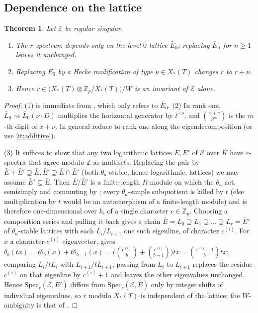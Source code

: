 \documentclass[11pt,reqno]{amsart}
\newcommand{\Zp}{\mathbb{Z}_p}
\newcommand{\ZZ}{\mathbb{Z}}
\newcommand{\cE}{\mathcal{E}}
\newcommand{\Xst}{X_*(T)}
\theoremstyle{plain}
\newtheorem{theorem}{Theorem}[section]
\theoremstyle{definition}
\theoremstyle{remark}
\numberwithin{equation}{section}
\begin{document}
\subsection{Dependence on the lattice}
\begin{theorem}\label{thm:welldef}
Let $\cE$ be regular singular.
\begin{enumerate}
\item The $r$-spectrum depends only on the level-$0$ lattice $\bar E_0$;
      replacing $\bar E_n$ for $n\ge1$ leaves it unchanged.
\item Replacing $\bar E_0$ by a Hecke modification of type $\nu\in\Xst$
      changes $r$ to $r+\nu$.
\item Hence
      $\bar r\in\bigl(\Xst\otimes\Zp/\Xst\bigr)/W$
      is an invariant of $\cE$ alone.
\end{enumerate}
\end{theorem}
\begin{proof}
(1) is immediate from , which only refers to $\bar E_0$.
(2) In rank one, $\bar L_0\rightsquigarrow\bar L_0(\nu\cdot D)$ multiplies
the horizontal generator by $t^{-\nu}$, and
$\binom{x+\nu}{p^m}$ is the $m$-th digit of $x+\nu$.  In general reduce to
rank one along the eigendecomposition (or use
\eqref{it:additive}).

(3) It suffices to show that any two logarithmic lattices $\bar E,\bar E'$
of $\cE$ over $K$ have $r$-spectra that agree modulo $\ZZ$ as multisets.
Replacing the pair by $\bar E+\bar E'\supseteq\bar E,\bar E'\supseteq
\bar E\cap\bar E'$ (both $\theta_a$-stable, hence logarithmic, lattices) we
may assume $\bar E'\subseteq\bar E$.  Then $\bar E/\bar E'$ is a
finite-length $R$-module on which the $\theta_a$ act, semisimply and
commuting by ; every $\theta_a$-simple subquotient is
killed by $t$ (else multiplication by $t$ would be an automorphism of a
finite-length module) and is therefore one-dimensional over $k$, of a
single character $c\in\Zp$.  Choosing a composition series and pulling it
back gives a chain
$\bar E=L_0\supsetneq L_1\supsetneq\dots\supsetneq L_r=\bar E'$ of
$\theta_a$-stable lattices with each $L_i/L_{i+1}$ one such eigenline, of
character $c^{(i)}$.  For $x$ a character-$c^{(i)}$ eigenvector,
 gives
$\theta_b(tx)=t\theta_b(x)+t\theta_{b-1}(x)
=\bigl(\binom{c^{(i)}}{b}+\binom{c^{(i)}}{b-1}\bigr)tx
=\binom{c^{(i)}+1}{b}tx$; comparing $L_i/tL_i$ with $L_{i+1}/tL_{i+1}$,
passing from $L_i$ to $L_{i+1}$ replaces the residue $c^{(i)}$ on that
eigenline by $c^{(i)}+1$ and leaves the other eigenvalues unchanged.
Hence $\mathrm{Spec}_r(\cE,\bar E')$ differs from
$\mathrm{Spec}_r(\cE,\bar E)$ only by integer shifts of individual
eigenvalues, so $\bar r$ modulo $\Xst$ is independent of the lattice; the
$W$-ambiguity is that of .
\end{proof}
\end{document}

